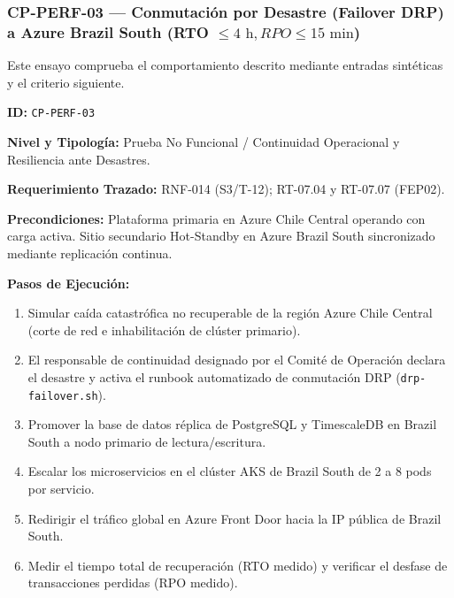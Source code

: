 \subsubsection*{CP-PERF-03 — Conmutación por Desastre (Failover DRP) a Azure Brazil South (RTO $\le 4\text{ h}, RPO \le 15\text{ min}$)}\label{sec:9-cp-perf-03}
Este ensayo comprueba el comportamiento descrito mediante entradas sintéticas y el criterio siguiente.

\par\noindent \textbf{ID:} \texttt{CP-\allowbreak{}PERF-\allowbreak{}03}\par
\par\noindent \textbf{Nivel y Tipología:} Prueba No Funcional / Continuidad Operacional y Resiliencia ante Desastres.\par
\par\noindent \textbf{Requerimiento Trazado:} RNF-014 (S3/T-12); RT-07.04 y RT-07.07 (FEP02).\par
\par\noindent \textbf{Precondiciones:} Plataforma primaria en Azure Chile Central operando con carga activa. Sitio secundario Hot-Standby en Azure Brazil South sincronizado mediante replicación continua.\par
\par\noindent \textbf{Pasos de Ejecución:}\par
\begin{enumerate}
\item Simular caída catastrófica no recuperable de la región Azure Chile Central (corte de red e inhabilitación de clúster primario).
\item El responsable de continuidad designado por el Comité de Operación declara el desastre y activa el runbook automatizado de conmutación DRP (\texttt{drp-\allowbreak{}failover.sh}).
\item Promover la base de datos réplica de PostgreSQL y TimescaleDB en Brazil South a nodo primario de lectura/escritura.
\item Escalar los microservicios en el clúster AKS de Brazil South de 2 a 8 pods por servicio.
\item Redirigir el tráfico global en Azure Front Door hacia la IP pública de Brazil South.
\item Medir el tiempo total de recuperación (RTO medido) y verificar el desfase de transacciones perdidas (RPO medido).
\end{enumerate}

